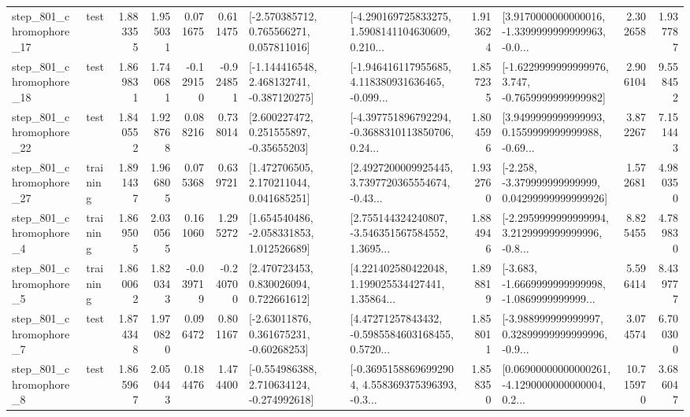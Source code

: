 \begin{tabular}{llrrrrllrlrr}
  step\_801\_chromophore\_17 &      test &      1.883355 &    1.955031 &      0.071675 &  0.611475 &    [-2.570385712, 0.765566271, 0.057811016] &  [-4.290169725833275, 1.5908141104630609, 0.210... &       1.913624 &  [3.9170000000000016, -1.3399999999999963, -0.0... &            2.302658 &          1.937787 \\
  step\_801\_chromophore\_18 &      test &      1.869831 &    1.740681 &     -0.129150 & -0.924851 &   [-1.144416548, 2.468132741, -0.387120275] &  [-1.946416117955685, 4.118380931636465, -0.099... &       1.857235 &  [-1.6229999999999976, 3.747, -0.7659999999999982] &            2.906104 &          9.558452 \\
  step\_801\_chromophore\_22 &      test &      1.840552 &    1.928768 &      0.088216 &  0.738014 &     [2.600227472, 0.251555897, -0.35655203] &  [-4.397751896792294, -0.3688310113850706, 0.24... &       1.804596 &  [3.9499999999999993, 0.1559999999999988, -0.69... &            3.872267 &          7.151443 \\
  step\_801\_chromophore\_27 &  training &      1.891437 &    1.966805 &      0.075368 &  0.639721 &     [1.472706505, 2.170211044, 0.041685251] &  [2.4927200009925445, 3.7397720365554674, -0.43... &       1.932760 &  [-2.258, -3.379999999999999, 0.04299999999999926] &            1.572681 &          4.980350 \\
   step\_801\_chromophore\_4 &  training &      1.869505 &    2.030565 &      0.161060 &  1.295272 &    [1.654540486, -2.058331853, 1.012526689] &  [2.755144324240807, -3.546351567584552, 1.3695... &       1.884946 &  [-2.2959999999999994, 3.2129999999999996, -0.8... &            8.825455 &          4.789830 \\
   step\_801\_chromophore\_5 &  training &      1.860062 &    1.820343 &     -0.039719 & -0.240700 &     [2.470723453, 0.830026094, 0.722661612] &  [4.221402580422048, 1.199025534427441, 1.35864... &       1.898819 &  [-3.683, -1.6669999999999998, -1.0869999999999... &            5.596414 &          8.439777 \\
   step\_801\_chromophore\_7 &      test &      1.874348 &    1.970820 &      0.096472 &  0.801167 &     [-2.63011876, 0.361675231, -0.60268253] &  [4.47271257843432, -0.5985584603168455, 0.5720... &       1.858011 &  [-3.988999999999997, 0.32899999999999996, -0.9... &            3.074574 &          6.700300 \\
   step\_801\_chromophore\_8 &      test &      1.865967 &    2.050443 &      0.184476 &  1.474400 &   [-0.554986388, 2.710634124, -0.274992618] &  [-0.36951588696992904, 4.558369375396393, -0.3... &       1.858350 &  [0.06900000000000261, -4.1290000000000004, 0.2... &           10.715970 &          3.686047 \\

\end{tabular}
